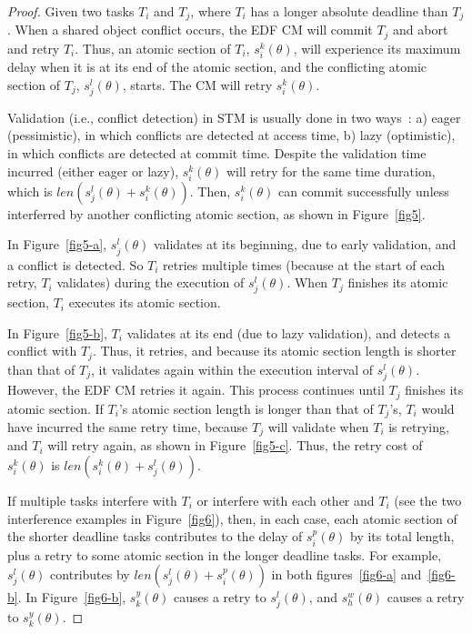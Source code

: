 \documentclass[a4paper,english]{article}
\newtheorem{proof}{Proof}
\begin{document}
\begin{proof}\normalfont
Given two tasks $T_{i}$ and $T_{j}$, where $T_{i}$ has a longer absolute deadline than $T_{j}$. When a shared object conflict occurs, the EDF CM will commit $T_{j}$ and abort and retry $T_{i}$.
Thus, an atomic section of $T_{i}$, $s_{i}^{k}(\theta)$,
will experience its maximum delay when it is at its end of the atomic section, 
and the conflicting atomic section of $T_{j}$, $s_{j}^{l}(\theta)$, starts. 
The CM will retry $s_{i}^{k}(\theta)$. 

Validation (i.e., conflict detection) in STM is usually done in two ways~\cite{austenmc:tcc:dissertation:2009}: a) eager (pessimistic), in which conflicts are detected at access time, b) lazy (optimistic), in which conflicts are detected at commit time. Despite the validation time incurred (either eager or lazy),  
$s_{i}^{k}(\theta)$ will retry for the same time duration, which is $len(s_{j}^{l}(\theta)+s_i^k(\theta))$. Then, $s_i^k(\theta)$ can commit successfully  
unless interferred by another conflicting atomic section, as shown in Figure~\ref{fig5}. 

In Figure~\ref{fig5-a}, $s_{j}^{l}(\theta)$
validates at its beginning, due to early validation, and a conflict
is detected. So $T_{i}$ retries multiple times (because at the start of each retry, $T_{i}$ validates) 
during the execution of $s_{j}^{l}(\theta)$.
When $T_{j}$ finishes its atomic section, $T_{i}$ executes its atomic section. 

In Figure~\ref{fig5-b}, 
$T_{i}$ validates at its end (due to lazy validation), and detects a conflict with $T_{j}$.
Thus, it retries, and because its atomic section length is shorter
than that of $T_{j}$, it validates again within the execution
interval of $s_{j}^{l}(\theta)$. However, the EDF CM retries it again.
This process continues until $T_{j}$ finishes its atomic section.
If $T_{i}$'s atomic section length is longer than that of $T_{j}$'s,
$T_{i}$ would have incurred the same retry time, because
$T_{j}$ will validate when $T_{i}$ is retrying, and $T_{i}$ will
retry again, as shown in Figure~\ref{fig5-c}. Thus, the retry cost
of $s_{i}^{k}(\theta)$ is $len(s_{i}^{k}(\theta)+s_{j}^{l}(\theta))$.

If multiple tasks interfere with $T_{i}$ or
interfere with each other and $T_{i}$ (see the two interference examples in Figure~\ref{fig6}), then, in each case, each atomic section of the shorter deadline tasks contributes to the delay of $s_{i}^{p}(\theta)$ by its total length, plus a retry to some atomic section in the longer deadline tasks. For example,
$s_{j}^{l}(\theta)$ contributes by $len(s_{j}^{l}(\theta)+s_{i}^{p}(\theta))$
in both figures~\ref{fig6-a} and~\ref{fig6-b}. 
In Figure~\ref{fig6-b}, $s_{k}^{y}(\theta)$ causes a retry 
to $s_{j}^{l}(\theta)$, and $s_{h}^{w}(\theta)$ causes a retry to $s_{k}^{y}(\theta)$.



\end{proof}
\end{document}

